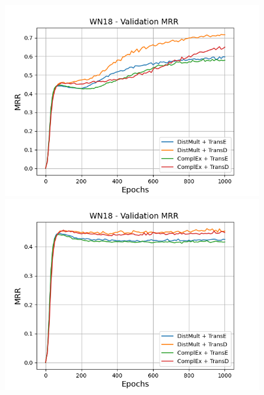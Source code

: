 \begin{figure}[H]
    \centering
    \begin{minipage}{.45\textwidth}
      \centering
      \includegraphics[width=0.9\linewidth]{figures/results/gan_train/not_pretrained/random/wn18/epochs1000/random_wn18_mrrs.png}
    \end{minipage}%
    \begin{minipage}{.45\textwidth}
      \centering
      \includegraphics[width=0.9\linewidth]{figures/results/gan_train/not_pretrained/uncertainty/max_distribution/entropy/wn18/1k_epochs/uncertainty_wn18_mrrs.png}
    \end{minipage}
    \begin{minipage}{.45\textwidth}
      \centering

\end{minipage}
\end{figure}
